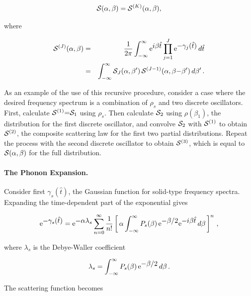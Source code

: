 \begin{equation}
   {\cal S}(\alpha,\beta)={\cal S}^{(K)}(\alpha,\beta),
\end{equation}

\noindent
where

\begin{eqnarray}
   {\cal S}^{(J)}(\alpha,\beta) &=&
      \frac{1}{2\pi}\int_{-\infty}^\infty{\rm e}^{\textstyle i\beta\hat{t}}
      \prod_{j=1}^J{\rm e}^{\textstyle -\gamma_j(\hat{t})}\,d\hat{t} \nonumber\\
     &=&\int_{-\infty}^\infty{\cal S}_J(\alpha,\beta')\,
        {\cal S}^{(J-1)}(\alpha,\beta{-}\beta')\,d\beta'\,.
\end{eqnarray}

\noindent
As an example of the use of this recursive procedure, consider a case
where the desired frequency spectrum is a combination of $\rho_s$ and
two discrete oscillators.  First, calculate ${\cal S}^{(1)}{=}{\cal
S}_1$ using $\rho_s$.  Then calculate ${\cal S}_2$ using
$\rho(\beta_1)$, the distribution for the first discrete oscillator,
and convolve ${\cal S}_2$ with ${\cal S}^{(1)}$ to obtain ${\cal
S}^{(2)}$, the composite scattering law for the first two partial
distributions.  Repeat the process with the second discrete oscillator
to obtain ${\cal S}^{(3)}$, which is equal to ${\cal S}(\alpha,\beta)$
for the full distribution.

\paragraph{The Phonon Expansion.} Consider
first $\gamma_s(\hat{t})$, the Gaussian function for solid-type
frequency spectra.  Expanding the time-dependent part of the exponential
gives

\begin{equation}
   {\rm e}^{\textstyle -\gamma_s(\hat{t})}={\rm e}^{\textstyle -\alpha\lambda_s}
      \sum_{n=0}^{\infty}\frac{1}{n!}\left[\,\alpha
      \int_{-\infty}^\infty P_s(\beta)\,{\rm e}^{\textstyle -\beta/2}{\rm e}^{\textstyle -i\beta\hat{t}}
      \,d\beta\,\right]^n\,,
\end{equation}

\noindent
where $\lambda_s$ is the Debye-Waller coefficient

\begin{equation}
   \lambda_s=\int_{-\infty}^\infty P_s(\beta)\,{\rm e}^{\textstyle -\beta/2}\,d\beta\,.
   \label{dbwf}
\end{equation}
\vspace{0.5 pt}

\noindent
The scattering function becomes

